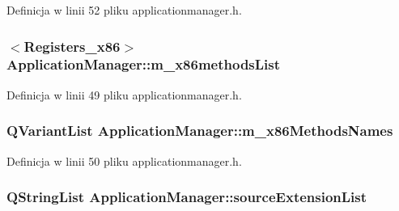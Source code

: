 Definicja w linii 52 pliku applicationmanager.\-h.

\hypertarget{class_application_manager_a95dbbdfce6b0865fad1dba671424bc81}{
\subsubsection[{m\-\_\-x86methods\-List}]{$<${\bf Registers\-\_\-x86}$>$ Application\-Manager\-::m\-\_\-x86methods\-List\hspace{0.3cm}{\ttfamily [private]}}}\label{class_application_manager_a95dbbdfce6b0865fad1dba671424bc81}


Definicja w linii 49 pliku applicationmanager.\-h.

\hypertarget{class_application_manager_a4535135d50421609e8c984860b0f9af6}{
\subsubsection[{m\-\_\-x86\-Methods\-Names}]{\setlength{\rightskip}{0pt plus 5cm}Q\-Variant\-List Application\-Manager\-::m\-\_\-x86\-Methods\-Names\hspace{0.3cm}{\ttfamily [private]}}}\label{class_application_manager_a4535135d50421609e8c984860b0f9af6}


Definicja w linii 50 pliku applicationmanager.\-h.

\hypertarget{class_application_manager_a64d34ed2c01cd33346e372f4174fa7aa}{
\subsubsection[{source\-Extension\-List}]{\setlength{\rightskip}{0pt plus 5cm}Q\-String\-List Application\-Manager\-::source\-Extension\-List\hspace{0.3cm}{\ttfamily [private]}}}\label{class_application_manager_a64d34ed2c01cd33346e372f4174fa7aa}


